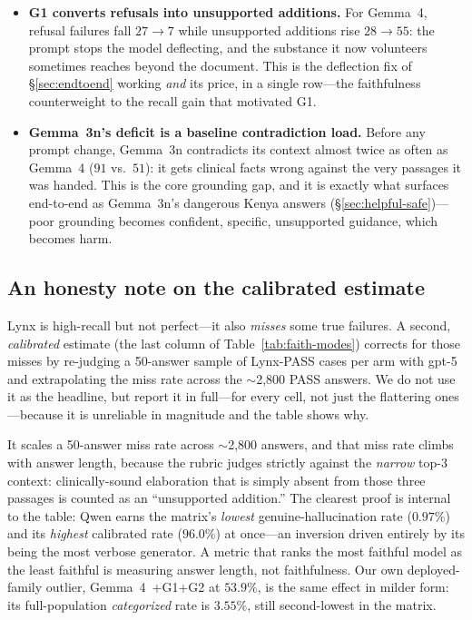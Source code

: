\begin{itemize}\setlength{\itemsep}{2pt}
  \item \textbf{G1 converts refusals into unsupported additions.} For
  Gemma~4, refusal failures fall $27\to7$ while unsupported additions rise
  $28\to55$: the prompt stops the model deflecting, and the substance it now
  volunteers sometimes reaches beyond the document. This is the deflection fix
  of \S\ref{sec:endtoend} working \emph{and} its price, in a single row---the
  faithfulness counterweight to the recall gain that motivated G1.
  \item \textbf{Gemma~3n's deficit is a baseline contradiction load.} Before
  any prompt change, Gemma~3n contradicts its context almost twice as often as
  Gemma~4 ($91$ vs.\ $51$): it gets clinical facts wrong against the very
  passages it was handed. This is the core grounding gap, and it is exactly
  what surfaces end-to-end as Gemma~3n's dangerous Kenya answers
  (\S\ref{sec:helpful-safe})---poor grounding becomes confident, specific,
  unsupported guidance, which becomes harm.
\end{itemize}

\subsection{An honesty note on the calibrated estimate}
\label{sec:faith-calibration}

Lynx is high-recall but not perfect---it also \emph{misses} some true
failures. A second, \emph{calibrated} estimate (the last column of
Table~\ref{tab:faith-modes}) corrects for those misses by re-judging a
50-answer sample of Lynx-PASS cases per arm with gpt-5 and extrapolating the
miss rate across the $\sim$2{,}800 PASS answers. We do not use it as the
headline, but report it in full---for every cell, not just the flattering
ones---because it is unreliable in magnitude and the table shows why.

It scales a 50-answer miss rate across $\sim$2{,}800 answers, and that miss
rate climbs with answer length, because the rubric judges strictly against the
\emph{narrow} top-3 context: clinically-sound elaboration that is simply absent
from those three passages is counted as an ``unsupported addition.'' The
clearest proof is internal to the table: Qwen earns the matrix's \emph{lowest}
genuine-hallucination rate ($0.97\%$) and its \emph{highest} calibrated rate
($96.0\%$) at once---an inversion driven entirely by its being the most verbose
generator. A metric that ranks the most faithful model as the least faithful is
measuring answer length, not faithfulness. Our own deployed-family outlier,
Gemma~4~+G1+G2 at $53.9\%$, is the same effect in milder form: its
full-population \emph{categorized} rate is $3.55\%$, still second-lowest in the
matrix.

